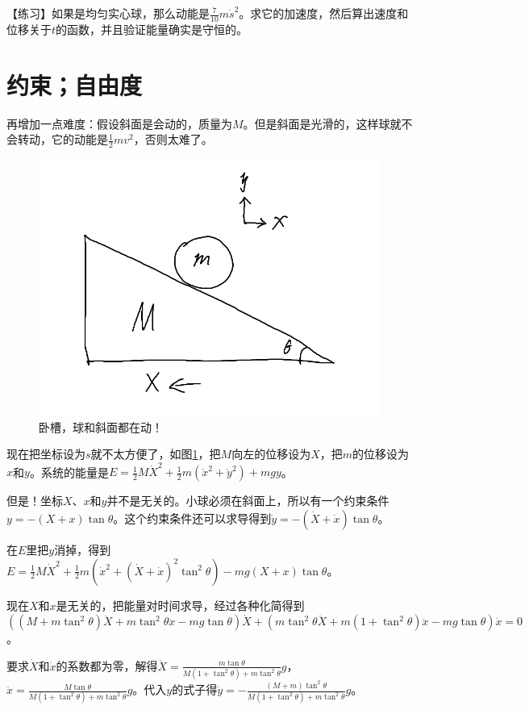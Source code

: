 【练习】如果是均匀实心球，那么动能是$\frac{7}{10} m \dot s^2$。求它的加速度，然后算出速度和位移关于$t$的函数，并且验证能量确实是守恒的。
\section{约束；自由度}
再增加一点难度：假设斜面是会动的，质量为$M$。但是斜面是光滑的，这样球就不会转动，它的动能是$\frac{1}{2} m v^2$，否则太难了。
\begin{figure}[htb]
\centering
\includegraphics[scale=0.5]{fig/slope-ball-2}
\caption{卧槽，球和斜面都在动！}
\label{fig-slope-ball-2}
\end{figure}

现在把坐标设为$s$就不太方便了，如图\ref{fig-slope-ball-2}，把$M$向左的位移设为$X$，把$m$的位移设为$x$和$y$。系统的能量是$E=\frac{1}{2} M \dot X^2+\frac{1}{2} m (\dot x^2+\dot y^2)+m g y$。

但是！坐标$X$、$x$和$y$并不是无关的。小球必须在斜面上，所以有一个约束条件$y=-(X+x) \tan \theta$。这个约束条件还可以求导得到$\dot y=-(\dot X+\dot x) \tan \theta$。

在$E$里把$y$消掉，得到$E=\frac{1}{2} M \dot X^2+\frac{1}{2} m (\dot x^2+(\dot X+\dot x)^2 \tan^2 \theta)-m g (X+x) \tan \theta$。

现在$X$和$x$是无关的，把能量对时间求导，经过各种化简得到$((M+m \tan^2 \theta) \ddot X+m \tan^2 \theta \ddot x-m g \tan \theta)\dot X+(m \tan^2 \theta \ddot X+m (1+\tan^2 \theta) \ddot x-m g \tan \theta)\dot x=0$。

要求$\dot X$和$\dot x$的系数都为零，解得$\ddot X=\frac{m \tan \theta}{M (1+\tan^2 \theta)+m \tan^2 \theta} g$，$\ddot x=\frac{M \tan \theta}{M (1+\tan^2 \theta)+m \tan^2 \theta} g$。代入$y$的式子得$\ddot y=-\frac{(M+m) \tan^2 \theta}{M (1+\tan^2 \theta)+m \tan^2 \theta} g$。

